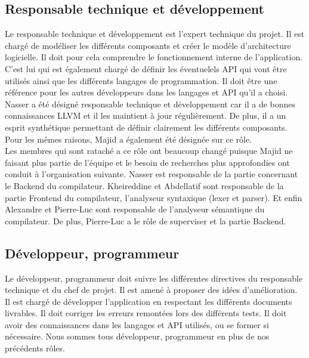 \documentclass{../res/univ-projet}
\begin{document}
  \subsection{Responsable technique et développement}
    Le responsable technique et développement est l’expert technique du projet. Il est chargé de modéliser les différents composants et créer le modèle d’architecture logicielle. Il doit pour cela comprendre le fonctionnement interne de l’application. C’est lui qui est également chargé de définir les éventuelels API qui vont être utilisés ainsi que les différents langages de programmation. Il doit être une référence pour les autres développeurs dans les langages et API qu’il a choisi. Nasser a été désigné responsable technique et développement car il a de bonnes connaissances LLVM et il les maintient à jour régulièrement. De plus, il a un esprit synthétique permettant de définir clairement les différents composants. Pour les mêmes raisons, Majid a également été désignée sur ce rôle.\\
    Les membres qui sont rataché a ce rôle ont beaucoup changé puisque Majid ne faisant plus partie de l'équipe et le besoin de recherches plus approfondies ont conduit à l'organisation suivante. Nasser est responsable de la partie concernant le Backend du compilateur. Kheireddine et Abdellatif sont responsable de la partie Frontend du compilateur, l'analyseur syntaxique (lexer et parser). Et enfin Alexandre et Pierre-Luc sont responsable de l'analyseur sémantique du compilateur. De plus, Pierre-Luc a le rôle de superviser et la partie Backend.
  \subsection{Développeur, programmeur}
    Le développeur, programmeur doit suivre les différentes directives du responsable technique et du chef de projet. Il est amené à proposer des idées d’amélioration. Il est chargé de développer l’application en respectant les différents documents livrables. Il doit corriger les erreurs remontées lors des différents tests. Il doit avoir des connaissances dans les langages et API utilisés, ou se former si nécessaire. Nous sommes tous développeur, programmeur en plus de nos précédents rôles. 
\end{document}
